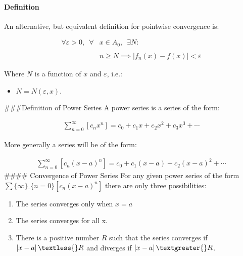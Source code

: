 \documentclass[class=article, crop=false]{standalone}
\begin{document}
\hypertarget{definition}{%
\paragraph{Definition}\label{definition}}

An alternative, but equivalent definition for pointwise convergence is:

\begin{align}
  \forall \varepsilon>0, \enspace \forall &x \in A_0, \enspace \exists N:\\
  \ \\
&n \geq N  \implies       \left| f_n\left( x \right)  -  f\left( x \right)  \right| < \varepsilon
\end{align}

Where \(N\) is a function of \(x\) and \(\varepsilon\), i.e.:

\begin{itemize}
\item
  \(N = N\left( \varepsilon, x \right)\).
\end{itemize}

\#\#\#Definition of Power Series A power series is a series of the form:

\begin{align}
  \sum^{\infty}_{n= 0} \left[ c_nx^n \right] = c_0+ c_1x+ c_2x^2+ c_3x^3 + \cdots
\end{align}

More generally a series will be of the form:

\begin{align}
  \sum^{\infty}_{n= 0} \left[ c_n \left( x- a \right) ^n \right] = c_0 +  c_1\left( x- a \right) + c_2\left( x- a \right) ^2 +  \cdots
\end{align}
 \#\#\#\# Convergence of Power Series For any given power series of
the form \( \sum\{\infty\}\_\{n= 0\}
\left[ c_n \left( x- a \right) ^n \right]\) there are only three
possibilities:

\begin{enumerate}
\def\labelenumi{\arabic{enumi}.}
\item
  The series converges only when \(x = a\)
\item
  The series converges for all x.
\item
  There is a positive number \(R\) such that the series converges if \(
  \left\lvert x- a \right\rvert \textless{} R\) and diverges if
  \( \left\lvert x - a \right\rvert \textgreater{} R\).
\end{enumerate}
\end{document}

